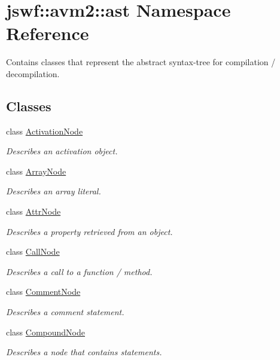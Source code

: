 \hypertarget{namespacejswf_1_1avm2_1_1ast}{\section{jswf\+:\+:avm2\+:\+:ast Namespace Reference}
\label{namespacejswf_1_1avm2_1_1ast}
}


Contains classes that represent the abstract syntax-\/tree for compilation / decompilation.  


\subsection*{Classes}
\begin{DoxyCompactItemize}
\item 
class \hyperlink{classjswf_1_1avm2_1_1ast_1_1_activation_node}{Activation\+Node}
\begin{DoxyCompactList}\small\item\em Describes an activation object. \end{DoxyCompactList}\item 
class \hyperlink{classjswf_1_1avm2_1_1ast_1_1_array_node}{Array\+Node}
\begin{DoxyCompactList}\small\item\em Describes an array literal. \end{DoxyCompactList}\item 
class \hyperlink{classjswf_1_1avm2_1_1ast_1_1_attr_node}{Attr\+Node}
\begin{DoxyCompactList}\small\item\em Describes a property retrieved from an object. \end{DoxyCompactList}\item 
class \hyperlink{classjswf_1_1avm2_1_1ast_1_1_call_node}{Call\+Node}
\begin{DoxyCompactList}\small\item\em Describes a call to a function / method. \end{DoxyCompactList}\item 
class \hyperlink{classjswf_1_1avm2_1_1ast_1_1_comment_node}{Comment\+Node}
\begin{DoxyCompactList}\small\item\em Describes a comment statement. \end{DoxyCompactList}\item 
class \hyperlink{classjswf_1_1avm2_1_1ast_1_1_compound_node}{Compound\+Node}
\begin{DoxyCompactList}\small\item\em Describes a node that contains statements. \end{DoxyCompactList}\item 

\end{DoxyCompactItemize}
